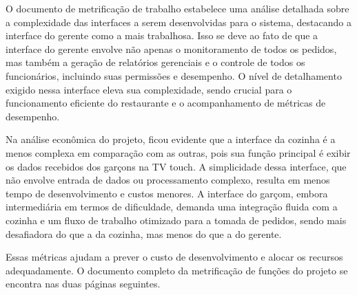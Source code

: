 \hspace{4.5mm}
O documento de metrificação de trabalho estabelece uma análise detalhada sobre a complexidade das interfaces a serem desenvolvidas para o sistema, destacando a interface do gerente como a mais trabalhosa. Isso se deve ao fato de que a interface do gerente envolve não apenas o monitoramento de todos os pedidos, mas também a geração de relatórios gerenciais e o controle de todos os funcionários, incluindo suas permissões e desempenho. O nível de detalhamento exigido nessa interface eleva sua complexidade, sendo crucial para o funcionamento eficiente do restaurante e o acompanhamento de métricas de desempenho.
\par
Na análise econômica do projeto, ficou evidente que a interface da cozinha é a menos complexa em comparação com as outras, pois sua função principal é exibir os dados recebidos dos garçons na TV touch. A simplicidade dessa interface, que não envolve entrada de dados ou processamento complexo, resulta em menos tempo de desenvolvimento e custos menores. A interface do garçom, embora intermediária em termos de dificuldade, demanda uma integração fluida com a cozinha e um fluxo de trabalho otimizado para a tomada de pedidos, sendo mais desafiadora do que a da cozinha, mas menos do que a do gerente. 
\par
Essas métricas ajudam a prever o custo de desenvolvimento e alocar os recursos adequadamente. O documento completo da metrificação de funções do projeto se encontra nas duas páginas seguintes.


